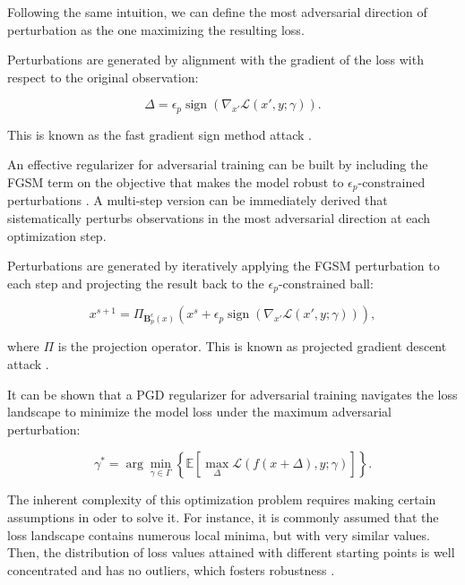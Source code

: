 Following the same intuition, we can define the most adversarial direction of 
perturbation as the one maximizing the resulting loss.

\begin{attack}[FGSM]
    Perturbations are generated by alignment with the gradient of the 
    loss with respect to the original observation:
    
    $$
    \Delta = \epsilon_p \operatorname{sign}(\nabla_{x'} \mathcal{L}(x', y; \gamma)).
    $$

    This is known as the fast gradient sign method attack
    \cite{goodfellowExplainingHarnessingAdversarial2015}.
\end{attack}

An effective regularizer for adversarial training can be built by 
including the FGSM term on the objective that makes the model robust 
to $\epsilon_p$-constrained perturbations \cite{goodfellowExplainingHarnessingAdversarial2015}. 
A multi-step version can be immediately derived that sistematically
perturbs observations in the most adversarial direction at each
optimization step.

\begin{attack}[PGD]
    Perturbations are generated by iteratively applying the FGSM
    perturbation to each step and projecting the result back to the
    $\epsilon_p$-constrained ball:

    $$
        x^{s+1} = \Pi_{\mathbf{B}_p^\epsilon(x)} \left ( x^s + \epsilon_p \operatorname{sign}(\nabla_{x'} \mathcal{L}(x', y; \gamma)) \right ),
    $$

    where $\Pi$ is the projection operator. This is known as
    projected gradient descent attack
    \cite{madryDeepLearningModels2019}.
    \label{attack:pgd}
\end{attack}

It can be shown that a PGD regularizer for adversarial training navigates
the loss landscape to minimize the model loss under
the maximum adversarial perturbation:

$$
    \gamma^* = \arg \min_{\gamma \in \Gamma} \left \{ \mathbb{E} \left[ \max_{\Delta} \mathcal{L} (f(x + \Delta), y; \gamma) \right]  \right \}.
$$

The inherent complexity of this optimization problem requires making
certain assumptions in oder to solve it. For instance, it is commonly
assumed that the loss landscape contains numerous local minima, but
with very similar values. Then, the distribution of loss values attained
with different starting points is well concentrated and has no outliers,
which fosters robustness
\cite{madryDeepLearningModels2019}.\\

